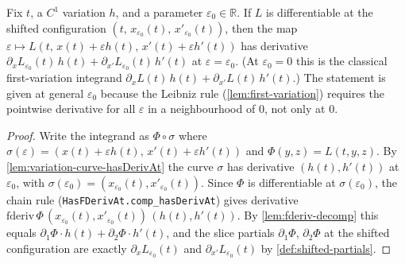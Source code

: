 \begin{lemma}
    \label{lem:integrand-hasDerivAt}
    \leanok
    Fix $t$, a $C^1$ variation $h$, and a parameter $\varepsilon_0 \in
    \mathbb{R}$. If $L$ is differentiable at the shifted configuration
    $(t,\, x_{\varepsilon_0}(t),\, x'_{\varepsilon_0}(t))$, then the map
    $\varepsilon \mapsto L(t,\, x(t) + \varepsilon h(t),\, x'(t) + \varepsilon h'(t))$
    has derivative
    $\partial_x L_{\varepsilon_0}(t)\, h(t) + \partial_{x'} L_{\varepsilon_0}(t)\,
    h'(t)$ at $\varepsilon = \varepsilon_0$. (At $\varepsilon_0 = 0$ this is the
    classical first-variation integrand
    $\partial_x L(t)\, h(t) + \partial_{x'} L(t)\, h'(t)$.) The statement is given
    at general $\varepsilon_0$ because the Leibniz rule
    (\cref{lem:first-variation}) requires the pointwise derivative for all
    $\varepsilon$ in a neighbourhood of $0$, not only at $0$.
\end{lemma}
\begin{proof}
    Write the integrand as $\Phi \circ \sigma$ where
    $\sigma(\varepsilon) = (x(t) + \varepsilon h(t),\, x'(t) + \varepsilon h'(t))$
    and $\Phi(y,z) = L(t,y,z)$. By \cref{lem:variation-curve-hasDerivAt} the curve
    $\sigma$ has derivative $(h(t), h'(t))$ at $\varepsilon_0$, with
    $\sigma(\varepsilon_0) = (x_{\varepsilon_0}(t), x'_{\varepsilon_0}(t))$. Since
    $\Phi$ is differentiable at $\sigma(\varepsilon_0)$, the chain rule
    (\texttt{HasFDerivAt.comp\_hasDerivAt}) gives derivative
    $\mathrm{fderiv}\, \Phi\, (x_{\varepsilon_0}(t),x'_{\varepsilon_0}(t))\,
    (h(t), h'(t))$. By \cref{lem:fderiv-decomp} this equals
    $\partial_1 \Phi \cdot h(t) + \partial_2 \Phi \cdot h'(t)$, and the slice
    partials $\partial_1 \Phi$, $\partial_2 \Phi$ at the shifted configuration are
    exactly $\partial_x L_{\varepsilon_0}(t)$ and
    $\partial_{x'} L_{\varepsilon_0}(t)$ by \cref{def:shifted-partials}.
\end{proof}

